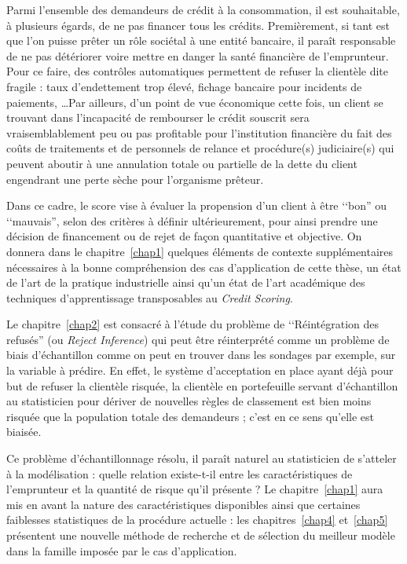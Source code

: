 Parmi l'ensemble des demandeurs de crédit à la consommation, il est souhaitable, à plusieurs égards, de ne pas financer tous les crédits. Premièrement, si tant est que l'on puisse prêter un rôle sociétal à une entité bancaire, il paraît responsable de ne pas détériorer voire mettre en danger la santé financière de l'emprunteur. Pour ce faire, des contrôles automatiques permettent de refuser la clientèle dite fragile : taux d'endettement trop élevé, fichage bancaire pour incidents de paiements, \ldots Par ailleurs, d'un point de vue économique cette fois, un client se trouvant dans l'incapacité de rembourser le crédit souscrit sera vraisemblablement peu ou pas profitable pour l'institution financière du fait des coûts de traitements et de personnels de relance et procédure(s) judiciaire(s) qui peuvent aboutir à une annulation totale ou partielle de la dette du client engendrant une perte sèche pour l'organisme prêteur.

Dans ce cadre, le score vise à évaluer la propension d'un client à être ‘‘bon'' ou ‘‘mauvais'', selon des critères à définir ultérieurement, pour ainsi prendre une décision de financement ou de rejet de façon quantitative et objective. On donnera dans le chapitre~\ref{chap1} quelques éléments de contexte supplémentaires nécessaires à la bonne compréhension des cas d'application de cette thèse, un état de l'art de la pratique industrielle ainsi qu'un état de l'art académique des techniques d'apprentissage transposables au \textit{Credit Scoring}.

Le chapitre~\ref{chap2} est consacré à l'étude du problème de ‘‘Réintégration des refusés'' (ou \textit{Reject Inference}) qui peut être réinterprété comme un problème de biais d'échantillon comme on peut en trouver dans les sondages par exemple, sur la variable à prédire. En effet, le système d'acceptation en place ayant déjà pour but de refuser la clientèle risquée, la clientèle en portefeuille servant d'échantillon au statisticien pour dériver de nouvelles règles de classement est bien moins risquée que la population totale des demandeurs ; c'est en ce sens qu'elle est biaisée.

Ce problème d'échantillonnage résolu, il paraît naturel au statisticien de s'atteler à la modélisation : quelle relation existe-t-il entre les caractéristiques de l'emprunteur et la quantité de risque qu'il présente ? Le chapitre~\ref{chap1} aura mis en avant la nature des caractéristiques disponibles ainsi que certaines faiblesses statistiques de la procédure actuelle : les chapitres~\ref{chap4} et~\ref{chap5} présentent une nouvelle méthode de recherche et de sélection du meilleur modèle dans la famille imposée par le cas d'application.

